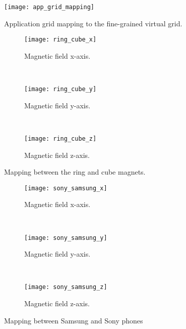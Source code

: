\documentclass[conference]{IEEEtran}
\begin{document}
\begin{figure}[!t]
\centering
\texttt{[image: app\_grid\_mapping]}
\caption{Application grid mapping to the fine-grained virtual grid.}
\label{fig:app_grid_mapping}
\end{figure}

\begin{figure*}[!t]
\centering
        \begin{subfigure}[t]{0.29\textwidth}
                \centering
                \texttt{[image: ring\_cube\_x]}
                \caption{Magnetic field x-axis.}
                \label{fig:x-axis}
        \end{subfigure}~~
        \begin{subfigure}[t]{0.29\textwidth}
                \centering
                \texttt{[image: ring\_cube\_y]}
                \caption{Magnetic field y-axis.}
                \label{fig:y-axis}
        \end{subfigure}~
        \begin{subfigure}[t]{0.29\textwidth}
                \centering
                \texttt{[image: ring\_cube\_z]}
                \caption{Magnetic field z-axis.}
                \label{fig:z-axis}
        \end{subfigure}

\caption{Mapping between the ring and cube magnets.}
\label{fig:ring_cube_mapping}
\vspace{-0.2in}
\end{figure*}

\begin{figure*}[!t]
\centering
        \begin{subfigure}[t]{0.29\textwidth}
                \centering
                \texttt{[image: sony\_samsung\_x]}
                \caption{Magnetic field x-axis.}
                \label{fig:x-axis}
        \end{subfigure}~~
        \begin{subfigure}[t]{0.29\textwidth}
                \centering
                \texttt{[image: sony\_samsung\_y]}
                \caption{Magnetic field y-axis.}
                \label{fig:y-axis}
        \end{subfigure}~
        \begin{subfigure}[t]{0.29\textwidth}
                \centering
                \texttt{[image: sony\_samsung\_z]}
                \caption{Magnetic field z-axis.}
                \label{fig:z-axis}
        \end{subfigure}

\caption{Mapping between Samsung and Sony phones}
\label{fig:samsung_sony_ring_mapping}
\vspace{-0.2in}
\end{figure*}
\end{document}
